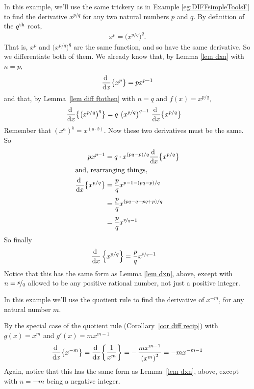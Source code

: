 \begin{eg}\label{eg:DIFFsimpleToolsG}
In this example, we'll use the same trickery as in Example
\ref{eg:DIFFsimpleToolsF} to find the derivative $x^{p/q}$
for any two natural numbers $p$ and $q$. By definition
of the $q^{\rm th}$ root,
\begin{align*}
x^p= \big(x^{p/q}\big)^q.
\end{align*}
That is, $x^p$ and  $\big(x^{p/q}\big)^q$ are the same function, and so have the same
derivative. So we differentiate both of them. We already know that, by Lemma \ref{lem
dxn}
with $n=p$,
\begin{align*}
\diff{}{x}\big\{x^p\big\}=p x^{p-1}
\end{align*}
and that, by Lemma~\ref{lem diff ftothen} with $n=q$ and $f(x)=x^{p/q}$,
\begin{align*}
\diff{}{x}\big\{\big(x^{p/q}\big)^q\big\}
& = q\ \big(x^{p/q}\big)^{q-1}\ \diff{}{x}\big\{x^{p/q}\big\}
\end{align*}
Remember that $(x^a)^b = x^{(a \cdot b)}$. Now these two derivatives
must be the same. So
\begin{align*}
p x^{p-1} &=q\cdot x^{(pq-p)/q} \diff{}{x}\big\{x^{p/q}\big\} \\
\intertext{and, rearranging things,}
\diff{}{x}\big\{x^{p/q}\big\}
   & =\frac{p}{q} x^{p-1-(pq-p)/q} \\[0.05in]
   & =\frac{p}{q} x^{(pq-q-pq+p)/q} \\[0.05in]
   & =\frac{p}{q} x^{\nicefrac{p}{q}-1}
\end{align*}
So finally
\begin{align}\label{eq:DIFFxpoverq}
  \diff{}{x} \left\{ x^{p/q} \right\} &= \frac{p}{q} x^{\nicefrac{p}{q} -1 }
\end{align}
Notice that this has the same form as Lemma \ref{lem dxn}, above,
except with $n=\nicefrac{p}{q}$ allowed to be any positive rational
number, not just a positive integer.
\end{eg}



\begin{eg}[Derivative of $x^{-n}$]\label{eg:DIFFsimpleToolsI}
In this example we'll use the quotient rule to find the derivative of
$x^{-m}$, for any natural number $m$.

By the special case of the quotient rule (Corollary~\ref{cor diff recip}) with $g(x)=x^m$
and $g'(x)=mx^{m-1}$
\begin{align*}
\diff{}{x}\big\{x^{-m}\big\}
=\diff{}{x}\bigg\{\frac{1}{x^m}\bigg\}
=-\,\frac{mx^{m-1}}{{(x^m)}^2}
=-m x^{-m-1}
\end{align*}
Again, notice that this has the same form as Lemma~\ref{lem dxn},
above, except with $n=-m$ being a negative integer.
\end{eg}

